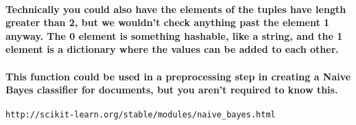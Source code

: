 \documentclass[11pt]{article}
\begin{document}
\paragraph{\textnormal{Technically you could also have the elements of the tuples have length greater than 2, but we wouldn't check anything past the element 1 anyway. The 0 element is something hashable, like a string, and the 1 element is a dictionary where the values can be added to each other.}}
\paragraph{\textnormal{This function could be used in a preprocessing step in creating a Naive Bayes classifier for documents, but you aren't required to know this.}}
\begin{verbatim}http://scikit-learn.org/stable/modules/naive_bayes.html\end{verbatim}
\end{document}

